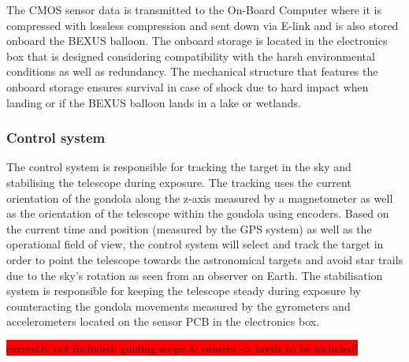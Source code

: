 The CMOS sensor data is transmitted to the On-Board Computer where it is compressed with lossless compression and sent down via E-link and is also stored onboard the BEXUS balloon. The onboard storage is located in the electronics box that is designed considering compatibility with the harsh environmental conditions as well as redundancy. The mechanical structure that features the onboard storage ensures survival in case of shock due to hard impact when landing or if the BEXUS balloon lands in a lake or wetlands.


\subsubsection{Control system}
The control system is responsible for tracking the target in the sky and stabilising the telescope during exposure. The tracking uses the current orientation of the gondola along the z-axis measured by a magnetometer as well as the orientation of the telescope within the gondola using encoders. Based on the current time and position (measured by the GPS system) as well as the operational field of view, the control system will select and track the target in order to point the telescope towards the astronomical targets and avoid star trails due to the sky's rotation as seen from an observer on Earth. The stabilisation system is responsible for keeping the telescope steady during exposure by counteracting the gondola movements measured by the gyrometers and accelerometers located on the sensor PCB in the electronics box.







\colorbox{red}{currently not included: guiding scope \& camera -> needs to be included!}













































\raggedbottom